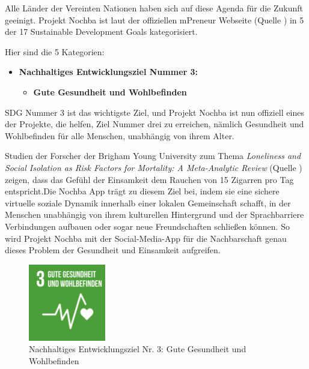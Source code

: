 Alle Länder der Vereinten Nationen haben sich auf diese Agenda für die Zukunft geeinigt. Projekt Nochba ist laut der offiziellen mPreneur Webseite (Quelle \cite{mPreneur-Website}) in 5 der 17 Sustainable Development Goals kategorisiert.

Hier sind die 5 Kategorien:

\begin{itemize}
    \item \textbf{Nachhaltiges Entwicklungsziel Nummer 3:}
          \begin{itemize}
              \item \textbf{Gute Gesundheit und Wohlbefinden}
          \end{itemize}
\end{itemize}

SDG Nummer 3 ist das wichtigste Ziel, und Projekt Nochba ist nun offiziell eines der Projekte, die helfen, Ziel Nummer drei zu erreichen, nämlich Gesundheit und Wohlbefinden für alle Menschen, unabhängig von ihrem Alter.

Studien der Forscher der Brigham Young University zum Thema \textit{Loneliness and Social Isolation as Risk Factors for Mortality: A Meta-Analytic Review} (Quelle \cite{Loneliness-and-Social-Isolation}) zeigen, dass das Gefühl der Einsamkeit dem Rauchen von 15 Zigarren pro Tag entspricht.Die Nochba App trägt zu diesem Ziel bei, indem sie eine sichere virtuelle soziale Dynamik innerhalb einer lokalen Gemeinschaft schafft, in der Menschen unabhängig von ihrem kulturellen Hintergrund und der Sprachbarriere Verbindungen aufbauen oder sogar neue Freundschaften schließen können. So wird Projekt Nochba mit der Social-Media-App für die Nachbarschaft genau dieses Problem der Gesundheit und Einsamkeit aufgreifen.

\begin{figure}[H]
    \centering
    \includegraphics[width=0.3\textwidth]{pics/3-Gesundheit-und-Wohlbefinden.png}
    \caption{Nachhaltiges Entwicklungsziel Nr. 3: Gute Gesundheit und Wohlbefinden}
    \label{fig:SDG03}
\end{figure}

